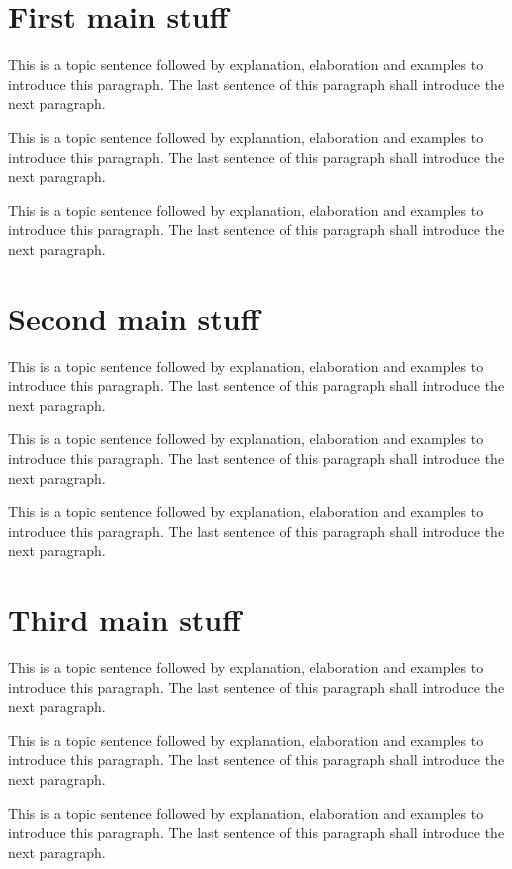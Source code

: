 \section{First main stuff}
\label{sec:ch_1_firstmain}

This is a topic sentence followed by explanation, elaboration and examples to introduce this paragraph. The last sentence of this paragraph shall introduce the next paragraph. \lipsum[1]

This is a topic sentence followed by explanation, elaboration and examples to introduce this paragraph. The last sentence of this paragraph shall introduce the next paragraph. \lipsum[1]

This is a topic sentence followed by explanation, elaboration and examples to introduce this paragraph. The last sentence of this paragraph shall introduce the next paragraph. \lipsum[1]

\section{Second main stuff}
\label{sec:ch_1_secondmain}

This is a topic sentence followed by explanation, elaboration and examples to introduce this paragraph. The last sentence of this paragraph shall introduce the next paragraph. \lipsum[1]

This is a topic sentence followed by explanation, elaboration and examples to introduce this paragraph. The last sentence of this paragraph shall introduce the next paragraph. \lipsum[1]

This is a topic sentence followed by explanation, elaboration and examples to introduce this paragraph. The last sentence of this paragraph shall introduce the next paragraph. \lipsum[1]

\section{Third main stuff}
\label{sec:ch_1_thirdmain}


This is a topic sentence followed by explanation, elaboration and examples to introduce this paragraph. The last sentence of this paragraph shall introduce the next paragraph. \lipsum[1]

This is a topic sentence followed by explanation, elaboration and examples to introduce this paragraph. The last sentence of this paragraph shall introduce the next paragraph. \lipsum[1]

This is a topic sentence followed by explanation, elaboration and examples to introduce this paragraph. The last sentence of this paragraph shall introduce the next paragraph. \lipsum[1]

